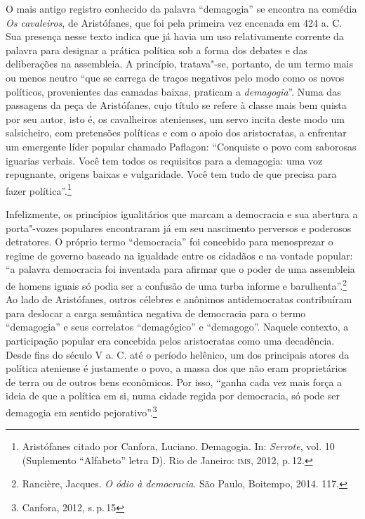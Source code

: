 O mais antigo registro conhecido da palavra ``demagogia'' se encontra na
comédia \emph{Os cavaleiros}, de Aristófanes, que foi pela primeira vez
encenada em 424 a. C. Sua presença nesse texto indica que já havia um
uso relativamente corrente da palavra para designar a prática política
sob a forma dos debates e das deliberações na assembleia. A princípio,
tratava"-se, portanto, de um termo mais ou menos neutro ``que se carrega
de traços negativos pelo modo como os novos políticos, provenientes das
camadas baixas, praticam a \emph{demagogia}''. Numa das passagens da
peça de Aristófanes, cujo título se refere à classe mais bem quista por
seu autor, isto é, os cavalheiros atenienses, um servo incita deste modo
um salsicheiro, com pretensões políticas e com o apoio dos aristocratas,
a enfrentar um emergente líder popular chamado Paflagon: ``Conquiste o
povo com saborosas iguarias verbais. Você tem todos os requisitos para a
demagogia: uma voz repugnante, origens baixas e vulgaridade. Você tem
tudo de que precisa para fazer política''.\footnote{Aristófanes citado
  por Canfora, Luciano. Demagogia. In: \emph{Serrote}, vol. 10
  (Suplemento ``Alfabeto'' letra D). Rio de Janeiro: \textsc{ims}, 2012, p.\,12.}

Infelizmente, os princípios igualitários que marcam a democracia e sua
abertura a porta"-vozes populares encontraram já em seu nascimento
perversos e poderosos detratores. O próprio termo ``democracia'' foi
concebido para menosprezar o regime de governo baseado na igualdade
entre os cidadãos e na vontade popular: ``a palavra democracia foi
inventada para afirmar que o poder de uma assembleia de homens iguais só
podia ser a confusão de uma turba informe e barulhenta''.\footnote{Rancière,
  Jacques. \emph{O ódio à democracia}. São Paulo, Boitempo, 2014. 117.}
Ao lado de Aristófanes, outros célebres e anônimos antidemocratas
contribuíram para deslocar a carga semântica negativa de democracia para
o termo ``demagogia'' e seus correlatos ``demagógico'' e ``demagogo''.
Naquele contexto, a participação popular era concebida pelos
aristocratas como uma decadência. Desde fins do século V a. C. até o
período helênico, um dos principais atores da política ateniense é
justamente o povo, a massa dos que não eram proprietários de terra ou de
outros bens econômicos. Por isso, ``ganha cada vez mais força a ideia de
que a política em si, numa cidade regida por democracia, só pode ser
demagogia em sentido pejorativo''.\footnote{Canfora, 2012, s.\,p.\,15}

